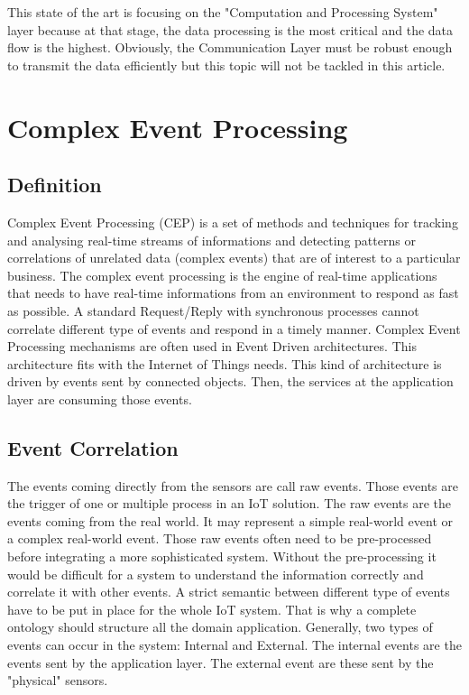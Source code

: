 \documentclass[11pt]{article}
\begin{document}
This state of the art is focusing on the "Computation and Processing System" layer because at that stage, the data processing is the most critical and the data flow is the highest. Obviously, the Communication Layer must be robust enough to transmit the data efficiently but this topic will not be tackled in this article.


\section{Complex Event Processing} \label{cep}

\subsection{Definition}

Complex Event Processing (CEP) is a set of methods and techniques for tracking
and analysing real-time streams of informations and detecting patterns or correlations
of unrelated data (complex events) that are of interest to a particular
business. \cite{1} The complex event processing is the engine of real-time applications that needs to have real-time informations from an environment to respond as fast as possible. A standard Request/Reply with synchronous processes cannot correlate different type of events and respond in a timely manner. Complex Event Processing mechanisms are often used in Event Driven architectures. This architecture fits with the Internet of Things needs. This kind of architecture is driven by events sent by connected objects. Then, the services at the application layer are consuming those events.

\subsection{Event Correlation}

The events coming directly from the sensors are call raw events. Those events are the trigger of one or multiple process in an IoT solution. The raw events are the events coming from the real world. It may represent a simple real-world event or a complex real-world event. Those raw events often need to be pre-processed before integrating a more sophisticated system. Without the pre-processing it would be difficult for a system to understand the information correctly and correlate it with other events. A strict semantic between different type of events have to be put in place for the whole IoT system. That is why a complete ontology should structure all the domain application. Generally, two types of events can occur in the system: Internal and External. The internal events are the events sent by the application layer. The external event are these sent by the "physical" sensors.
\end{document}
